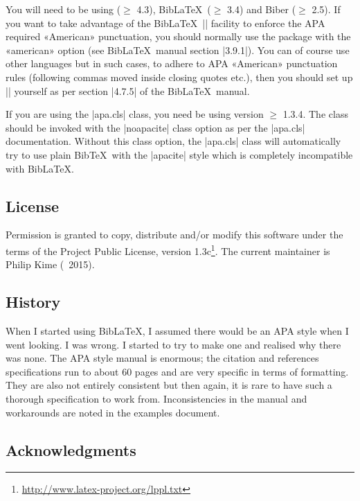 \documentclass{ltxdockit}
\begin{document}
You will need to be using  ($\geq$ 4.3), Bib\LaTeX\ ($\geq$
3.4) and Biber ($\geq$ 2.5). If you want to take advantage of the
Bib\LaTeX\ |\DeclareQuotePunctuation| facility to enforce the APA required
«American» punctuation, you should normally use the  package
with the «american» option (see Bib\LaTeX\ manual section |3.9.1|). You can
of course use other languages but in such cases, to adhere to APA
«American» punctuation rules (following commas moved inside closing quotes
etc.), then you should set up |\DeclareQuotePunctuation| yourself as per
section |4.7.5| of the Bib\LaTeX\ manual.

If you are using the |apa.cls| \latex class, you need be using version
$\geq$ 1.3.4. The class should be invoked with the |noapacite| class option
as per the |apa.cls| documentation. Without this class option, the
|apa.cls| class will automatically try to use plain Bib\TeX\ with the
|apacite| style which is completely incompatible with Bib\LaTeX.

\subsection{License}

Permission is granted to copy, distribute and/or modify this software under
the terms of the \latex Project Public License, version
1.3c\footnote{\url{http://www.latex-project.org/lppl.txt}}. The current
maintainer is Philip Kime (\textcopyright\ 2015).

\subsection{History}

When I started using Bib\LaTeX, I assumed there would be an APA style
when I went looking. I was wrong. I started to try to make one and realised
why there was none. The APA style manual is enormous; the citation and
references specifications run to about 60 pages and are very specific in
terms of formatting. They are also not entirely consistent but then again,
it is rare to have such a thorough specification to work from.
Inconsistencies in the manual and workarounds are noted in the examples
document.

\subsection{Acknowledgments}
\end{document}
